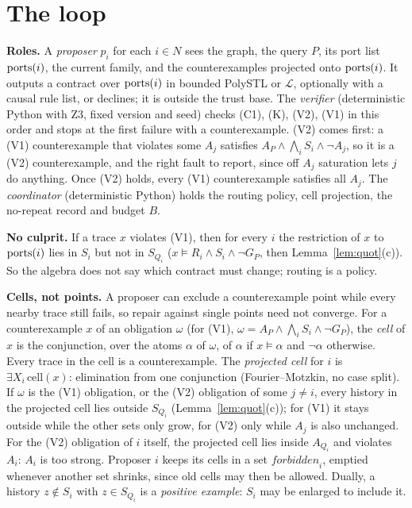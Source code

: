\documentclass[10pt]{article}
\theoremstyle{tplain}\newtheorem{theorem}{Theorem}\newtheorem{lemma}[theorem]{Lemma}\newtheorem{proposition}[theorem]{Proposition}\newtheorem{corollary}[theorem]{Corollary}\newtheorem{claim}[theorem]{Claim}
\theoremstyle{tdef}\newtheorem{definition}[theorem]{Definition}
\begin{document}
\section{The loop}
\textbf{Roles.} A \emph{proposer} $p_i$ for each $i\in N$ sees the graph, the query $P$, its port list $\mathrm{ports}(i)$, the current family, and the counterexamples projected onto $\mathrm{ports}(i)$. It outputs a contract over $\mathrm{ports}(i)$ in bounded PolySTL or $\mathcal L$, optionally with a causal rule list, or declines; it is outside the trust base. The \emph{verifier} (deterministic Python with Z3, fixed version and seed) checks (C1), (K), (V2), (V1) in this order and stops at the first failure with a counterexample. (V2) comes first: a (V1) counterexample that violates some $A_j$ satisfies $A_P\wedge\bigwedge_iS_i\wedge\neg A_j$, so it is a (V2) counterexample, and the right fault to report, since off $A_j$ saturation lets $j$ do anything. Once (V2) holds, every (V1) counterexample satisfies all $A_j$. The \emph{coordinator} (deterministic Python) holds the routing policy, cell projection, the no-repeat record and budget $B$.

\textbf{No culprit.} If a trace $x$ violates (V1), then for every $i$ the restriction of $x$ to $\mathrm{ports}(i)$ lies in $S_i$ but not in $S_{Q_i}$ ($x\models R_i\wedge S_i\wedge\neg G_P$, then Lemma~\ref{lem:quot}(c)). So the algebra does not say which contract must change; routing is a policy.

\textbf{Cells, not points.} A proposer can exclude a counterexample point while every nearby trace still fails, so repair against single points need not converge. For a counterexample $x$ of an obligation $\omega$ (for (V1), $\omega=A_P\wedge\bigwedge_iS_i\wedge\neg G_P$), the \emph{cell} of $x$ is the conjunction, over the atoms $\alpha$ of $\omega$, of $\alpha$ if $x\models\alpha$ and $\neg\alpha$ otherwise. Every trace in the cell is a counterexample. The \emph{projected cell} for $i$ is $\exists X_i\,\mathrm{cell}(x)$: elimination from one conjunction (Fourier--Motzkin, no case split). If $\omega$ is the (V1) obligation, or the (V2) obligation of some $j\ne i$, every history in the projected cell lies outside $S_{Q_i}$ (Lemma~\ref{lem:quot}(c)); for (V1) it stays outside while the other sets only grow, for (V2) only while $A_j$ is also unchanged. For the (V2) obligation of $i$ itself, the projected cell lies inside $A_{Q_i}$ and violates $A_i$: $A_i$ is too strong. Proposer $i$ keeps its cells in a set $\mathit{forbidden}_i$, emptied whenever another set shrinks, since old cells may then be allowed. Dually, a history $z\notin S_i$ with $z\in S_{Q_i}$ is a \emph{positive example}: $S_i$ may be enlarged to include it.
\end{document}
